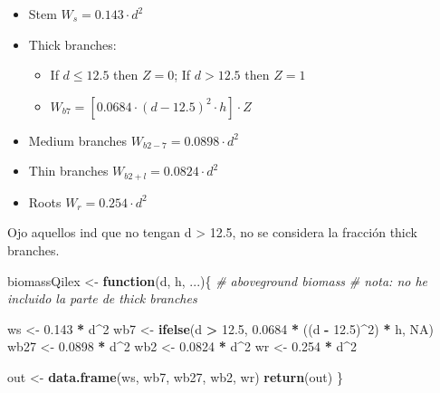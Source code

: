 \documentclass[]{article}
\newenvironment{Shaded}{\begin{snugshade}}{\end{snugshade}}
\newcommand{\CommentTok}[1]{\textcolor[rgb]{0.56,0.35,0.01}{\textit{#1}}}
\newcommand{\ControlFlowTok}[1]{\textcolor[rgb]{0.13,0.29,0.53}{\textbf{#1}}}
\newcommand{\DecValTok}[1]{\textcolor[rgb]{0.00,0.00,0.81}{#1}}
\newcommand{\FloatTok}[1]{\textcolor[rgb]{0.00,0.00,0.81}{#1}}
\newcommand{\KeywordTok}[1]{\textcolor[rgb]{0.13,0.29,0.53}{\textbf{#1}}}
\newcommand{\NormalTok}[1]{#1}
\newcommand{\OperatorTok}[1]{\textcolor[rgb]{0.81,0.36,0.00}{\textbf{#1}}}
\newcommand{\OtherTok}[1]{\textcolor[rgb]{0.56,0.35,0.01}{#1}}
\newcommand{\StringTok}[1]{\textcolor[rgb]{0.31,0.60,0.02}{#1}}
\providecommand{\tightlist}{%
  \setlength{\itemsep}{0pt}\setlength{\parskip}{0pt}}
\begin{document}
\begin{itemize}
\tightlist
\item
  Stem \(W_{s} = 0.143 \cdot d^2\)
\item
  Thick branches:

  \begin{itemize}
  \tightlist
  \item
    If \(d \leq 12.5\) then \(Z = 0\); If \(d > 12.5\) then \(Z = 1\)
  \item
    \(W_{b7} = [0.0684 \cdot (d - 12.5)^2 \cdot h ]\cdot Z\)
  \end{itemize}
\item
  Medium branches \(W_{b2-7} = 0.0898 \cdot d^2\)
\item
  Thin branches \(W_{b2+l} = 0.0824 \cdot d^2\)
\item
  Roots \(W_{r} = 0.254 \cdot d^2\)
\end{itemize}

Ojo aquellos ind que no tengan d \textgreater{} 12.5, no se considera la
fracción thick branches.

\begin{Shaded}
\begin{Highlighting}[]
\NormalTok{biomassQilex <-}\StringTok{ }\ControlFlowTok{function}\NormalTok{(d, h, ...)\{}
  \CommentTok{# aboveground biomass }
  \CommentTok{# nota: no he incluido la parte de thick branches }

\NormalTok{  ws <-}\StringTok{ }\FloatTok{0.143} \OperatorTok{*}\StringTok{ }\NormalTok{d}\OperatorTok{^}\DecValTok{2}
\NormalTok{  wb7 <-}\StringTok{ }\KeywordTok{ifelse}\NormalTok{(d }\OperatorTok{>}\StringTok{ }\FloatTok{12.5}\NormalTok{, }\FloatTok{0.0684} \OperatorTok{*}\StringTok{ }\NormalTok{((d }\OperatorTok{-}\StringTok{ }\FloatTok{12.5}\NormalTok{)}\OperatorTok{^}\DecValTok{2}\NormalTok{) }\OperatorTok{*}\StringTok{ }\NormalTok{h, }\OtherTok{NA}\NormalTok{)}
\NormalTok{  wb27 <-}\StringTok{ }\FloatTok{0.0898} \OperatorTok{*}\StringTok{ }\NormalTok{d}\OperatorTok{^}\DecValTok{2}
\NormalTok{  wb2 <-}\StringTok{  }\FloatTok{0.0824} \OperatorTok{*}\StringTok{ }\NormalTok{d}\OperatorTok{^}\DecValTok{2}
\NormalTok{  wr <-}\StringTok{ }\FloatTok{0.254} \OperatorTok{*}\StringTok{ }\NormalTok{d}\OperatorTok{^}\DecValTok{2}
  
\NormalTok{  out <-}\StringTok{ }\KeywordTok{data.frame}\NormalTok{(ws, wb7, wb27, wb2, wr)}
  \KeywordTok{return}\NormalTok{(out)}
\NormalTok{\} }
\end{Highlighting}
\end{Shaded}
\end{document}
